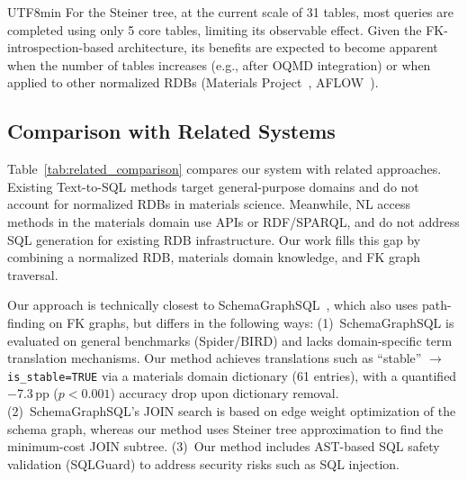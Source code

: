 \documentclass[sn-mathphys,Numbered]{sn-jnl}
\begin{document}
\begin{CJK}{UTF8}{min}
For the Steiner tree, at the current scale of 31 tables, most
queries are completed using only 5 core tables, limiting its
observable effect.
Given the FK-introspection-based architecture, its benefits are
expected to become apparent when the number of tables increases
(e.g., after OQMD integration) or when applied to other
normalized RDBs (Materials Project~\cite{jain2013mp},
AFLOW~\cite{curtarolo2012aflow}).

\subsection{Comparison with Related Systems}

Table~\ref{tab:related_comparison} compares our system with
related approaches.
Existing Text-to-SQL methods target general-purpose domains and
do not account for normalized RDBs in materials science.
Meanwhile, NL access methods in the materials domain use APIs or
RDF/SPARQL, and do not address SQL generation for existing RDB
infrastructure.
Our work fills this gap by combining a normalized RDB, materials
domain knowledge, and FK graph traversal.

Our approach is technically closest to
SchemaGraphSQL~\cite{safdarian2026schemagraphsql}, which also
uses path-finding on FK graphs, but differs in the following ways:
(1)~SchemaGraphSQL is evaluated on general benchmarks (Spider/BIRD)
and lacks domain-specific term translation mechanisms.
Our method achieves translations such as
``stable'' $\to$ \texttt{is\_stable=TRUE} via a materials domain
dictionary (61 entries), with a quantified $-$7.3\,pp ($p<0.001$)
accuracy drop upon dictionary removal.
(2)~SchemaGraphSQL's JOIN search is based on edge weight
optimization of the schema graph, whereas our method uses Steiner
tree approximation to find the minimum-cost JOIN subtree.
(3)~Our method includes AST-based SQL safety validation (SQLGuard)
to address security risks such as SQL injection.


\end{CJK}
\end{document}
